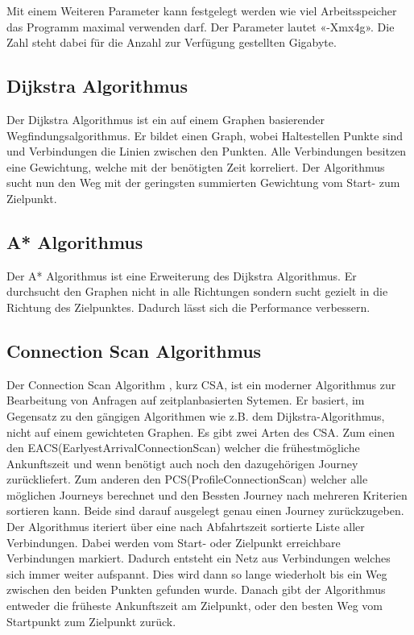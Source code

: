 Mit einem Weiteren Parameter kann festgelegt werden wie viel Arbeitsspeicher das Programm maximal verwenden darf. Der Parameter lautet «-Xmx4g». Die Zahl steht dabei für die Anzahl zur Verfügung gestellten Gigabyte.


\subsection{Dijkstra Algorithmus}
Der Dijkstra Algorithmus \cite{dij_bell} ist ein auf einem Graphen basierender Wegfindungsalgorithmus. Er bildet einen Graph, wobei Haltestellen Punkte sind und Verbindungen die Linien zwischen den Punkten. Alle Verbindungen besitzen eine Gewichtung, welche mit der benötigten Zeit korreliert. Der Algorithmus sucht nun den Weg mit der geringsten summierten Gewichtung vom Start- zum Zielpunkt.

\subsection{A* Algorithmus}
Der A* Algorithmus \cite{dij_a} ist eine Erweiterung des Dijkstra Algorithmus. Er durchsucht den Graphen nicht in alle Richtungen sondern sucht gezielt in die Richtung des Zielpunktes. Dadurch lässt sich die Performance verbessern.

\subsection{Connection Scan Algorithmus}
Der Connection Scan Algorithm \cite{csa} , kurz CSA,  ist ein moderner Algorithmus zur Bearbeitung von Anfragen auf zeitplanbasierten Sytemen. Er basiert, im Gegensatz zu den gängigen Algorithmen wie z.B. dem Dijkstra-Algorithmus, nicht auf einem gewichteten Graphen. 
Es gibt zwei Arten des CSA. Zum einen den EACS(EarlyestArrivalConnectionScan) welcher die frühestmögliche Ankunftszeit und wenn benötigt auch noch den dazugehörigen Journey zurückliefert. Zum anderen den PCS(ProfileConnectionScan) welcher alle möglichen Journeys berechnet und den Bessten Journey nach mehreren Kriterien sortieren kann. Beide sind darauf ausgelegt genau einen Journey zurückzugeben.
Der Algorithmus iteriert über eine nach Abfahrtszeit sortierte Liste aller Verbindungen. Dabei werden vom Start- oder Zielpunkt erreichbare Verbindungen markiert. Dadurch entsteht ein Netz aus Verbindungen welches sich immer weiter aufspannt. Dies wird dann so lange wiederholt bis ein Weg zwischen den beiden Punkten gefunden wurde. Danach gibt der Algorithmus entweder die früheste Ankunftszeit am Zielpunkt, oder den besten Weg vom Startpunkt zum Zielpunkt zurück.




